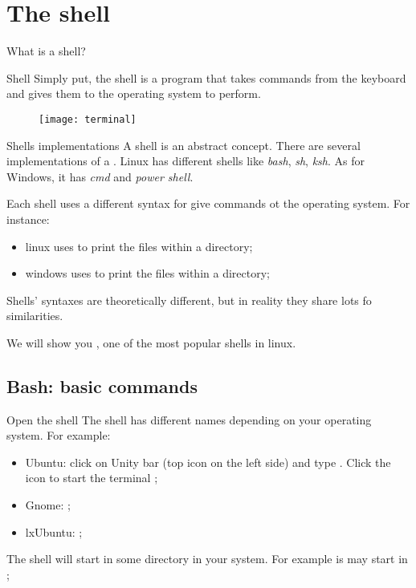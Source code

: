 \section{The shell}

\begin{frame}{What is a shell?}

\begin{block}{Shell}
Simply put, the shell is a program that takes commands from the keyboard and gives them to the operating system to perform\cite{whatIsTheShell}.
\end{block}

\begin{figure}
	\centering
	\texttt{[image: terminal]}
\end{figure}

\end{frame}

\begin{frame}{Shells implementations}
	A shell is an abstract concept. There are several implementations of a . Linux has different shells like \textit{bash}, \textit{sh}, \textit{ksh}. As for Windows, it has \textit{cmd} and \textit{power shell}.
	
	Each shell uses a different syntax for give commands ot the operating system. For instance:
	\begin{itemize}
		\item linux uses  to print the files within a directory;
		\item windows uses  to print the files within a directory;
	\end{itemize}
	
	Shells' syntaxes are theoretically different, but in reality they share lots fo similarities.
	
	\begin{note}
		We will show you , one of the most popular shells in linux.
	\end{note}
\end{frame}

\subsection{Bash: basic commands}

\begin{frame}{Open the shell}
	The shell has different names depending on your operating system. For example:
	\begin{itemize}
		\item Ubuntu: click on Unity bar (top icon on the left side) and type . Click the icon to start the terminal \cite{ubuntu:openterminal};
		\item Gnome: ;
		\item lxUbuntu: ;
	\end{itemize}
	
	The shell will start in some directory in your system. For example is may start in ;
\end{frame}

